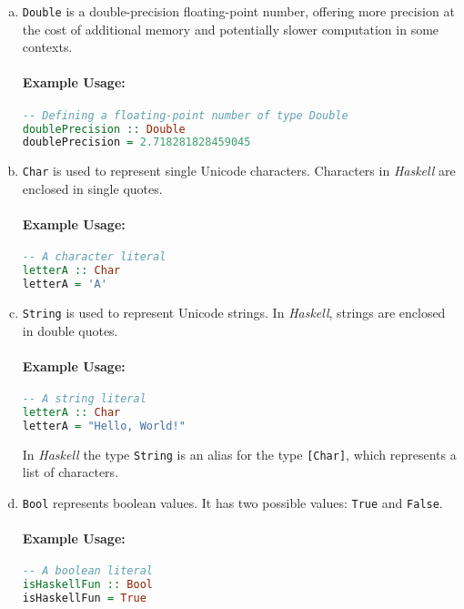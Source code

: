 \begin{enumerate}[(a)]
\item \texttt{Double} is a double-precision floating-point number, offering more precision at the cost of
      additional memory and potentially slower computation in some contexts. 

\paragraph{Example Usage:}
\begin{lstlisting}[style=haskellstyle, language=Haskell]
-- Defining a floating-point number of type Double
doublePrecision :: Double
doublePrecision = 2.718281828459045
\end{lstlisting}

\item \texttt{Char} is used to represent single Unicode characters. Characters in \textsl{Haskell} are enclosed
      in single quotes. 

\paragraph{Example Usage:}
\begin{lstlisting}[style=haskellstyle, language=Haskell]
-- A character literal
letterA :: Char
letterA = 'A'
\end{lstlisting}

\item \texttt{String} is used to represent Unicode strings.  In \textsl{Haskell}, strings are enclosed in double quotes.

\paragraph{Example Usage:}
\begin{lstlisting}[style=haskellstyle, language=Haskell]
-- A string literal
letterA :: Char
letterA = "Hello, World!"
\end{lstlisting}
In \textsl{Haskell} the type \texttt{String} is an alias for the type \texttt{[Char]}, which represents a list
of characters.

\item \texttt{Bool} represents boolean values. It has two possible values: \texttt{True} and \texttt{False}.

\paragraph{Example Usage:}
\begin{lstlisting}[style=haskellstyle, language=Haskell]
-- A boolean literal
isHaskellFun :: Bool
isHaskellFun = True
\end{lstlisting}


\end{enumerate}
